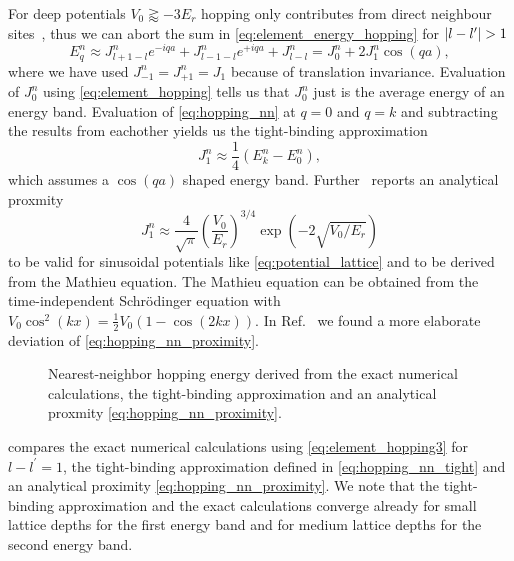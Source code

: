 For deep potentials $V_0\gtrapprox-3E_r$ hopping only contributes from direct
neighbour sites~\cite{Rom2009}, thus we can abort the sum in
\cref{eq:element_energy_hopping} for $\abs{l-l^\prime}>1$
\begin{equation}
  E^n_q
  \approx J^n_{l+1-l}e^{-iqa}+J^n_{l-1-l}e^{+iqa}+J^n_{l-l}
  =J^n_0+2J^n_1\cos(qa),
  \label{eq:hopping_nn}
\end{equation}
where we have used $J^n_{-1}=J^n_{+1}=J_1$ because of translation invariance.
Evaluation of $J^n_0$ using \cref{eq:element_hopping} tells us that $J^n_0$
just is the average energy of an energy band. Evaluation of
\cref{eq:hopping_nn} at $q=0$ and $q=k$ and subtracting the results from
eachother yields us the tight-binding approximation
\begin{equation}
  J^n_1\approx\frac{1}{4}\left(E^n_k-E^n_0\right),
  \label{eq:hopping_nn_tight}
\end{equation}
which assumes a $\cos(qa)$ shaped energy band. Further~\cite{Bloch2008}
reports an analytical proxmity
\begin{equation}
  J^n_1\approx
  \frac{4}{\sqrt{\pi}}\left(\frac{V_0}{E_r}\right)^{3/4}\exp(-2\sqrt{V_0/E_r})
  \label{eq:hopping_nn_proximity}
\end{equation}
to be valid for sinusoidal potentials like \cref{eq:potential_lattice} and
to be derived from the Mathieu equation. The Mathieu equation can be obtained
from the time-independent Schrödinger equation with
$V_0\cos^2(kx)=\frac{1}{2}V_0\left(1-\cos(2kx)\right)$.
In Ref.~\cite{Connor1984} we found a more elaborate deviation of
\cref{eq:hopping_nn_proximity}.
\begin{figure}[htb]
  \centering
  \begin{adjustbox}{width=\textwidth}
    
  \end{adjustbox}
  \caption{Nearest-neighbor hopping energy derived from the exact numerical
    calculations, the tight-binding approximation and an analytical proxmity
    \cref{eq:hopping_nn_proximity}.
  }\label{fig:scale_hopping_nn}
\end{figure}
 compares the exact numerical calculations using
\cref{eq:element_hopping3} for $l-l^\prime=1$, the tight-binding approximation
defined in \cref{eq:hopping_nn_tight} and an analytical proximity
\cref{eq:hopping_nn_proximity}. We note that the tight-binding approximation
and the exact calculations converge already for small lattice depths for the
first energy band and for medium lattice depths for the second energy band.
